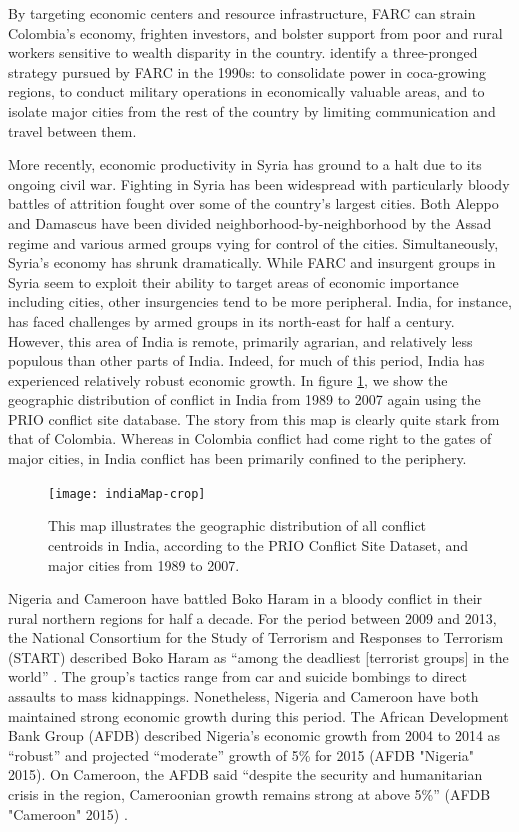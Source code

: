 By targeting economic centers and resource infrastructure, FARC can strain Colombia's economy, frighten investors, and bolster support from poor and rural workers sensitive to wealth disparity in the country. \citet{rabasa:chalk:2001} identify a three-pronged strategy pursued by FARC in the 1990s: to consolidate power in coca-growing regions, to conduct military operations in economically valuable areas, and to isolate major cities from the rest of the country by limiting communication and travel between them.  

More recently, economic productivity in Syria has ground to a halt due to its ongoing civil war. Fighting in Syria has been widespread with particularly bloody battles of attrition fought over some of the country's largest cities. Both Aleppo and Damascus have been divided neighborhood-by-neighborhood by the Assad regime and various armed groups vying for control of the cities. Simultaneously, Syria's economy has shrunk dramatically. While FARC and insurgent groups in Syria seem to exploit their ability to target areas of economic importance including cities, other insurgencies tend to be more peripheral. India, for instance, has faced challenges by armed groups in its north-east for half a century. However, this area of India is remote, primarily agrarian, and relatively less populous than other parts of India. Indeed, for much of this period, India has experienced relatively robust economic growth. In figure \ref{fig:indiaMap}, we show the geographic distribution of conflict in India from 1989 to 2007 again using the PRIO conflict site database. The story from this map is clearly quite stark from that of Colombia. Whereas in Colombia conflict had come right to the gates of major cities, in India conflict has been primarily confined to the periphery.

\begin{figure}[ht]
	\centering
	\texttt{[image: indiaMap-crop]}
	\caption{This map illustrates the geographic distribution of all conflict centroids in India, according to the PRIO Conflict Site Dataset, and major cities from 1989 to 2007. }
	\label{fig:indiaMap}
\end{figure}

Nigeria and Cameroon have battled Boko Haram in a bloody conflict in their rural northern regions for half a decade. For the period between 2009 and 2013, the National Consortium for the Study of Terrorism and Responses to Terrorism (START) described Boko Haram as ``among the deadliest [terrorist groups] in the world'' \citep{pate:etal:2014}. The group's tactics range from car and suicide bombings to direct assaults to mass kidnappings. Nonetheless, Nigeria and Cameroon have both maintained strong economic growth during this period. The African Development Bank Group (AFDB) described Nigeria's economic growth from 2004 to 2014 as ``robust'' and projected ``moderate'' growth of 5\% for 2015 (AFDB "Nigeria" 2015)\nocite{afdb:nigeria:2015}. On Cameroon, the AFDB said ``despite the security and humanitarian crisis in the region, Cameroonian growth remains strong at above 5\%'' (AFDB "Cameroon" 2015) \nocite{afdb:cameroon:2015}.

